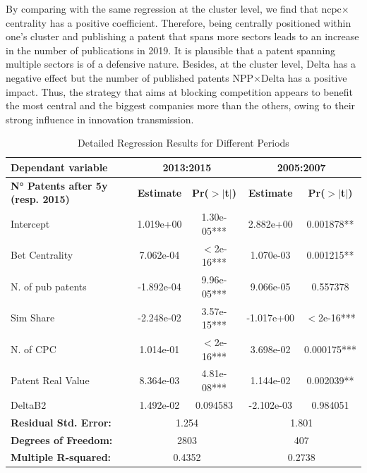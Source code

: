 \documentclass[12pt]{article}
\begin{document}
By comparing with the same regression at the cluster level, we find that ncpc$\times$centrality has a positive coefficient. Therefore, being centrally positioned within one's cluster and publishing a patent that spans more sectors leads to an increase in the number of publications in 2019. It is plausible that a patent spanning multiple sectors is of a defensive nature. Besides, at the cluster level, Delta has a negative effect but the number of published patents NPP$\times$Delta has a positive impact. Thus, the strategy that aims at blocking competition appears to benefit the most central and the biggest companies more than the others, owing to their strong influence in innovation transmission. 


\begin{table}[h!]
\centering
\caption{Detailed Regression Results for Different Periods}
\label{tab:regression_results}
\begin{tabular}{lcccc}
\toprule
\textbf{Dependant variable} & \multicolumn{2}{c}{\textbf{2013:2015}} & \multicolumn{2}{c}{\textbf{2005:2007}} \\
\midrule
\textbf{N° Patents after 5y (resp. 2015)} & \textbf{Estimate} & \textbf{Pr($>|$t$|$)} & \textbf{Estimate} & \textbf{Pr($>|$t$|$)} \\
\midrule
Intercept          & 1.019e+00 & 1.30e-05*** & 2.882e+00 & 0.001878** \\
Bet Centrality          & 7.062e-04 & $<$2e-16***   & 1.070e-03 & 0.001215** \\
N. of pub patents                  & -1.892e-04 & 9.96e-05*** & 9.066e-05 & 0.557378 \\
Sim Share           & -2.248e-02 & 3.57e-15*** & -1.017e+00 & $<$2e-16*** \\
N. of CPC             & 1.014e-01 & $<$2e-16***   & 3.698e-02 & 0.000175*** \\
Patent Real Value            & 8.364e-03 & 4.81e-08*** & 1.144e-02 & 0.002039** \\
DeltaB2                  & 1.492e-02 & 0.094583    & -2.102e-03 & 0.984051 \\
\midrule
\multicolumn{1}{l}{\textbf{Residual Std. Error:}} & \multicolumn{2}{c}{1.254} & \multicolumn{2}{c}{1.801} \\
\multicolumn{1}{l}{\textbf{Degrees of Freedom:}} & \multicolumn{2}{c}{2803} & \multicolumn{2}{c}{407} \\
\multicolumn{1}{l}{\textbf{Multiple R-squared:}} & \multicolumn{2}{c}{0.4352} & \multicolumn{2}{c}{0.2738} \\

\end{tabular}
\end{table}
\end{document}

